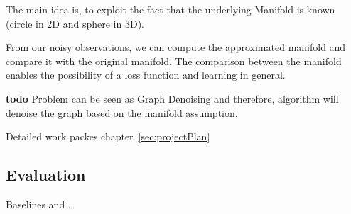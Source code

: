 The main idea is, to exploit the fact that the underlying Manifold is known (circle in 2D and sphere in 3D). 

From our noisy observations, we can compute the approximated manifold and compare it with the original manifold.
The comparison between the manifold enables the possibility of a loss function and learning in general.


\textbf{todo}
Problem can be seen as Graph Denoising and therefore, algorithm 
will denoise the graph based on the manifold assumption.


Detailed work packes chapter~\ref{sec:projectPlan}

\subsection{Evaluation}

Baselines \cite{multiDiffusionMaps} and \cite{LaplaceRandomProjections}.

